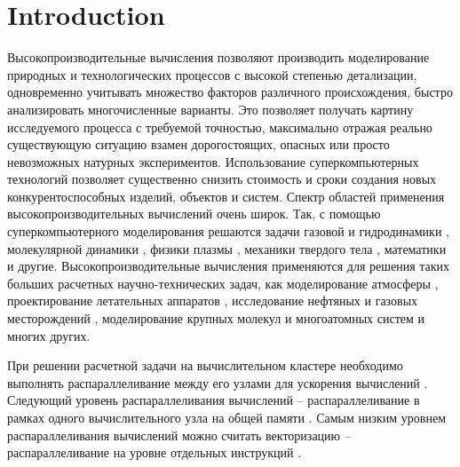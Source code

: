 \documentclass[
11pt,%
tightenlines,%
twoside,%
onecolumn,%
nofloats,%
nobibnotes,%
nofootinbib,%
superscriptaddress,%
noshowpacs,%
centertags]%
{revtex4}
\begin{document}


\maketitle


\section{Introduction}

Высокопроизводительные вычисления позволяют производить моделирование природных и технологических процессов с высокой степенью детализации, одновременно учитывать множество факторов различного происхождения, быстро анализировать многочисленные варианты.
Это позволяет получать картину исследуемого процесса с требуемой точностью, максимально отражая реально существующую ситуацию взамен дорогостоящих, опасных или просто невозможных натурных экспериментов.
Использование суперкомпьютерных технологий позволяет существенно снизить стоимость и сроки создания новых конкурентоспособных изделий, объектов и систем.
Спектр областей применения высокопроизводительных вычислений очень широк.
Так, с помощью суперкомпьютерного моделирования решаются задачи газовой и гидродинамики \cite{01Smirnov}, молекулярной динамики \cite{02Guo}, физики плазмы \cite{03Asch}, механики твердого тела \cite{04Morgan}, математики \cite{05Lohiya} и другие.
Высокопроизводительные вычисления применяются для решения таких больших расчетных научно-технических задач, как моделирование атмосферы \cite{06Kang}, проектирование летательных аппаратов \cite{07Morad}, исследование нефтяных и газовых месторождений \cite{08Eremin}, моделирование крупных молекул и многоатомных систем \cite{09Yan} и многих других.

При решении расчетной задачи на вычислительном кластере необходимо выполнять распараллеливание между его узлами для ускорения вычислений \cite{10Voevodin}.
Следующий уровень распараллеливания вычислений -- распараллеливание в рамках одного вычислительного узла на общей памяти \cite{11Zhou}.
Самым низким уровнем распараллеливания вычислений можно считать векторизацию – распараллеливание на уровне отдельных инструкций \cite{12Feng}.
\end{document}

